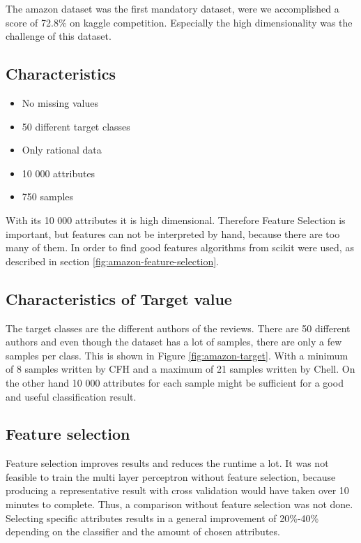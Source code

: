 The amazon dataset was the first mandatory dataset, were we accomplished a score of 72.8\% on kaggle competition. Especially the high dimensionality was the challenge of this dataset.

\subsection{Characteristics}

\begin{itemize}
\item No missing values
\item 50 different target classes
\item Only rational data
\item 10 000 attributes
\item 750 samples
\end{itemize}

With its 10 000 attributes it is high dimensional.
Therefore Feature Selection is important, but features can not be interpreted by hand, because there are too many of them.
In order to find good features algorithms from scikit were used, as described in section \ref{fig:amazon-feature-selection}.

\subsection{Characteristics of Target value}
The target classes are the different authors of the reviews.
There are 50 different authors and even though the dataset has a lot of samples, there are only a few samples per class.
This is shown in Figure \ref{fig:amazon-target}. With a minimum of 8 samples written by CFH and a maximum of 21 samples written by Chell. 
On the other hand 10 000 attributes for each sample might be sufficient for a good and useful classification result.




\subsection{Feature selection}
\label{amazon-feature-selection}
Feature selection improves results and reduces the runtime a lot. It was not feasible to train the multi layer perceptron without feature selection, because producing a representative result with cross validation would have taken over 10 minutes to complete. Thus, a comparison without feature selection was not done. Selecting specific attributes results in a general improvement of 20\%-40\% depending on the classifier and the amount of chosen attributes. 

